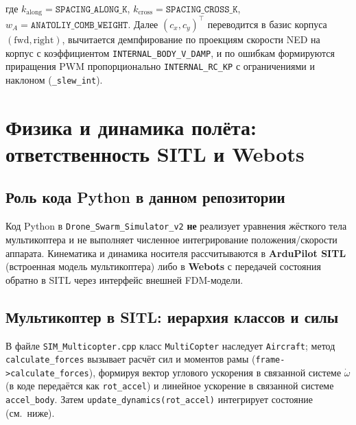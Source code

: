 \documentclass[12pt,a4paper]{article}
\begin{document}
где $k_{\mathrm{along}} = \texttt{SPACING\_ALONG\_K}$, $k_{\mathrm{cross}} = \texttt{SPACING\_CROSS\_K}$, $w_A = \texttt{ANATOLIY\_COMB\_WEIGHT}$. Далее $(c_x, c_y)^\top$ переводится в базис корпуса $(\mathrm{fwd}, \mathrm{right})$, вычитается демпфирование по проекциям скорости NED на корпус с коэффициентом \texttt{INTERNAL\_BODY\_V\_DAMP}, и по ошибкам формируются приращения PWM пропорционально \texttt{INTERNAL\_RC\_KP} с ограничениями и наклоном (\texttt{\_slew\_int}).

\section{Физика и динамика полёта: ответственность SITL и Webots}

\subsection{Роль кода Python в данном репозитории}

Код Python в \texttt{Drone\_Swarm\_Simulator\_v2} \textbf{не} реализует уравнения жёсткого тела мультикоптера и не выполняет численное интегрирование положения/скорости аппарата. Кинематика и динамика носителя рассчитываются в \textbf{ArduPilot SITL} (встроенная модель мультикоптера) либо в \textbf{Webots} с передачей состояния обратно в SITL через интерфейс внешней FDM-модели.

\subsection{Мультикоптер в SITL: иерархия классов и силы}

В файле \texttt{SIM\_Multicopter.cpp} класс \texttt{MultiCopter} наследует \texttt{Aircraft}; метод \texttt{calculate\_forces} вызывает расчёт сил и моментов рамы (\texttt{frame->calculate\_forces}), формируя вектор углового ускорения в связанной системе $\dot{\omega}$ (в коде передаётся как \texttt{rot\_accel}) и линейное ускорение в связанной системе \texttt{accel\_body}. Затем \texttt{update\_dynamics(rot\_accel)} интегрирует состояние (см.\ ниже).
\end{document}
